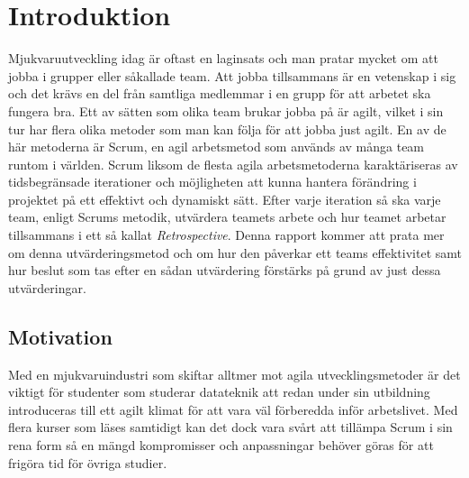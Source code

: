 

\chapter{Introduktion}
\label{cha:introduction}

Mjukvaruutveckling idag är oftast en laginsats och man pratar mycket om att jobba i grupper eller såkallade team.
Att jobba tillsammans är en vetenskap i sig och det krävs en del från samtliga medlemmar i en grupp för att arbetet ska fungera bra.
Ett av sätten som olika team brukar jobba på är agilt, vilket i sin tur har flera olika metoder som man kan följa för att jobba just agilt.
En av de här metoderna är Scrum, en agil arbetsmetod som används av många team runtom i världen.
Scrum liksom de flesta agila arbetsmetoderna karaktäriseras av tidsbegränsade iterationer och möjligheten att kunna hantera förändring i
projektet på ett effektivt och dynamiskt sätt. Efter varje iteration så ska varje team, enligt Scrums metodik, utvärdera teamets arbete och hur teamet arbetar tillsammans i ett så kallat \textit{Retrospective}. Denna rapport kommer att prata mer om denna utvärderingsmetod och om hur den påverkar ett teams effektivitet samt hur beslut som tas efter en sådan utvärdering förstärks på grund av just dessa utvärderingar.



\section{Motivation}
\label{sec:motivation}




Med en mjukvaruindustri som skiftar alltmer mot agila utvecklingsmetoder
är det viktigt för studenter som studerar datateknik att redan
under sin utbildning introduceras till ett agilt klimat för att
vara väl förberedda inför arbetslivet. Med flera kurser som läses
samtidigt kan det dock vara svårt att tillämpa Scrum i sin rena form
så en mängd kompromisser och anpassningar behöver göras för att
frigöra tid för övriga studier.


